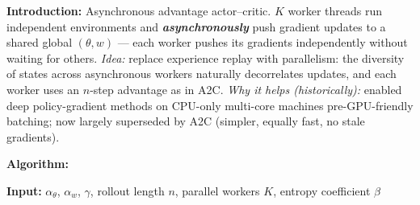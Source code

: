 \documentclass[11pt]{article}
\begin{document}
    \label{intro-4-4}

    \textbf{Introduction:} Asynchronous advantage actor--critic. \(K\)
worker threads run independent environments and
\textbf{\emph{asynchronously}} push gradient updates to a shared global
\((\theta, w)\) --- each worker pushes its gradients independently
without waiting for others. \emph{Idea:} replace experience replay with
parallelism: the diversity of states across asynchronous workers
naturally decorrelates updates, and each worker uses an \(n\)-step
advantage as in A2C. \emph{Why it helps (historically):} enabled deep
policy-gradient methods on CPU-only multi-core machines pre-GPU-friendly
batching; now largely superseded by A2C (simpler, equally fast, no stale
gradients).

    \textbf{Algorithm:}

\textbf{Input:} \(\alpha_\theta\), \(\alpha_w\), \(\gamma\), rollout
length \(n\), parallel workers \(K\), entropy coefficient \(\beta\)
\end{document}
